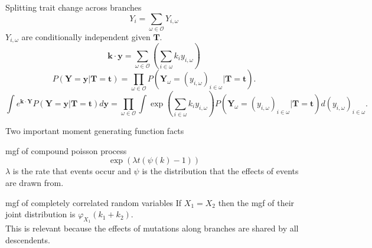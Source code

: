\documentclass{beamer}
\begin{document}
\begin{frame}{Splitting trait change across branches}
  \begin{equation*}
    Y_i = \sum_{\omega \in \mathcal{O}} Y_{i,\omega}
  \end{equation*}
  $Y_{i,\omega}$ are conditionally independent given $\mathbf{T}$. 
  \begin{equation*}
    \mathbf{k} \cdot \mathbf{y} = \sum_{\omega \in \mathcal{O}}\left( \sum_{i \in \omega} k_iy_{i,\omega}\right)
  \end{equation*}
  \begin{equation*}
    P(\mathbf{Y}=\mathbf{y}|\mathbf{T}=\mathbf{t}) = \prod_{\omega \in \mathcal{O}}
    P(\mathbf{Y}_{\omega}=(y_{i,\omega})_{i \in \omega} | \mathbf{T}=\mathbf{t}).
  \end{equation*}
  \footnotesize
  \begin{equation*} \label{eq:factor}
    \int e^{\mathbf{k} \cdot \mathbf{Y}} P(\mathbf{Y}=\mathbf{y} |\mathbf{T}=\mathbf{t}) d\mathbf{y} =
    \prod_{\omega \in \mathcal{O}}\int \exp\left(\sum_{i \in \omega}k_iy_{i,\omega}\right)
    P(\mathbf{Y}_{\omega}=(y_{i,\omega})_{i \in \omega} | \mathbf{T}=\mathbf{t})d(y_{i,\omega})_{i \in \omega}.
  \end{equation*}
  \normalsize
\end{frame}

\begin{frame}{Two important moment generating function facts}
  \begin{block}{mgf of compound poisson process}
    \begin{equation*}
      \exp\left(\lambda t (\psi(k)-1)\right)
    \end{equation*}
    $\lambda$ is the rate that events occur and $\psi$ is the distribution that
    the effects of events are drawn from. 
  \end{block}
  \begin{block}{mgf of completely correlated random variables}
    If $X_1=X_2$ then the mgf of their joint distribution is
    $\varphi_{X_1}(k_1+k_2)$.\\
    This is relevant because the effects of mutations along branches are shared
    by all descendents.
  \end{block}
\end{frame}
\end{document}
